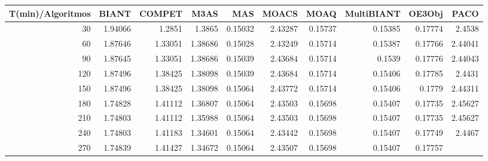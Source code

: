\begin{table}[h]
    \centering
    \begin{tabular}{|r|r|r|r|r|r|r|r|r|r|}
        \hline \tiny T(min)/Algoritmos & \tiny {BIANT} & \tiny {COMPET} & \tiny {M3AS} & \tiny
        {MAS} & \tiny {MOACS} & \tiny {MOAQ} & \tiny {MultiBIANT} & \tiny {OE3Obj} & \tiny {PACO} \\
        \hline \tiny 30 &{\tiny 1.94066}    &{\tiny 1.2851}    &{\tiny 1.3865}    &{\tiny 0.15032}
        &{\tiny 2.43287}    &{\tiny 0.15737}    &{\tiny 0.15385}    &{\tiny 0.17774}    &{\tiny 2.4538} \\
        \hline \tiny 60 &{\tiny 1.87646}    &{\tiny 1.33051}    &{\tiny 1.38686}    &{\tiny
        0.15028}    &{\tiny 2.43249}    &{\tiny 0.15714}    &{\tiny 0.15387}    &{\tiny 0.17766}
        &{\tiny 2.44041} \\
        \hline \tiny 90 &{\tiny 1.87645}    &{\tiny 1.33051}    &{\tiny 1.38686}    &{\tiny
        0.15039}    &{\tiny 2.43684}    &{\tiny 0.15714}    &{\tiny 0.1539}    &{\tiny 0.17776}
        &{\tiny 2.44043} \\
        \hline \tiny 120 &{\tiny 1.87496}    &{\tiny 1.38425}    &{\tiny 1.38098}    &{\tiny
        0.15039}    &{\tiny 2.43684}    &{\tiny 0.15714}    &{\tiny 0.15406}    &{\tiny 0.17785}
        &{\tiny 2.4431} \\
        \hline \tiny 150 &{\tiny 1.87496}    &{\tiny 1.38425}    &{\tiny 1.38098}    &{\tiny
        0.15064}    &{\tiny 2.43772}    &{\tiny 0.15714}    &{\tiny 0.15406}    &{\tiny 0.1779}
        &{\tiny 2.44311} \\
        \hline \tiny 180 &{\tiny 1.74828}    &{\tiny 1.41112}    &{\tiny 1.36807}    &{\tiny
        0.15064}    &{\tiny 2.43503}    &{\tiny 0.15698}    &{\tiny 0.15407}    &{\tiny 0.17735}
        &{\tiny 2.45627} \\
        \hline \tiny 210 &{\tiny 1.74803}    &{\tiny 1.41112}    &{\tiny 1.35988}    &{\tiny
        0.15064}    &{\tiny 2.43503}    &{\tiny 0.15698}    &{\tiny 0.15407}    &{\tiny 0.17735}
        &{\tiny 2.45627} \\
        \hline \tiny 240 &{\tiny 1.74803}    &{\tiny 1.41183}    &{\tiny 1.34601}    &{\tiny
        0.15064}    &{\tiny 2.43442}    &{\tiny 0.15698}    &{\tiny 0.15407}    &{\tiny 0.17749}
        &{\tiny 2.4467} \\
        \hline \tiny 270 &{\tiny 1.74839}    &{\tiny 1.41427}    &{\tiny 1.34672}    &{\tiny
        0.15064}    &{\tiny 2.43507}    &{\tiny 0.15698}    &{\tiny 0.15407}    &{\tiny 0.17757}

\end{tabular}
\end{table}
